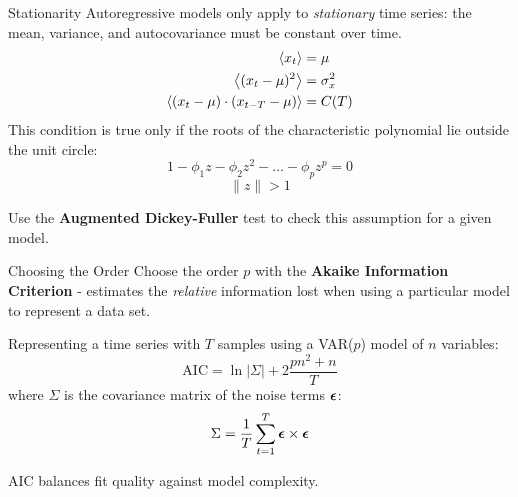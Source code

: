 \begin{frame}{Stationarity}
    Autoregressive models only apply to \emph{stationary} time series:
    the mean, variance, and autocovariance must be constant over time.
        \begin{align*}
            \left< x_t \right> &= \mu \\
            \left< (x_t - \mu)^2 \right> &= \sigma_x^2 \\
            \left< (x_t - \mu) \cdot (x_{t-T} - \mu) \right> &= C(T)
        \end{align*}             
    This condition is true only if the roots of the characteristic 
    polynomial lie outside the unit circle:        
    \[ 1 - \phi_1 z - \phi_2 z^2 - \ldots - \phi_p z^p = 0 \]
    \[ \| z \| > 1 \]
    
    Use the \textbf{Augmented Dickey-Fuller} test to check this 
    assumption for a given model.
\end{frame}

\begin{frame}{Choosing the Order}
    Choose the order $p$ with the \textbf{Akaike Information Criterion} - estimates the
    \emph{relative} information lost when using a particular model to represent
    a data set.
    
    Representing  a time series with $T$ samples using a VAR($p$) model of $n$ variables:
    \[ \mathrm{AIC} = \ln|\Sigma| + 2\frac{p n^2 + n}{T} \]
    where $\Sigma$ is the covariance matrix of the noise terms $\boldsymbol{\epsilon}$:
    \[ \Sigma = \frac{1}{T} \sum_{t=1}^T \boldsymbol{\epsilon} \times \boldsymbol{\epsilon} \]
    
    AIC balances fit quality against model complexity.
\end{frame}